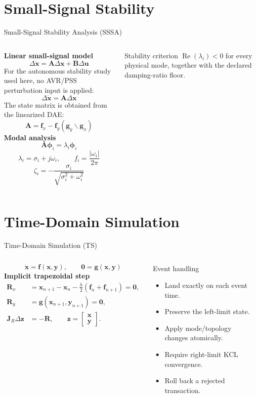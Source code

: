 \documentclass{beamer}
\begin{document}
\section{Small-Signal Stability}
\begin{frame}{Small-Signal Stability Analysis (SSSA)}
\begin{columns}[c,onlytextwidth]
\small
\textbf{Linear small-signal model}
\[
\Delta\dot{\bm x}=\bm A\Delta\bm x+\bm B\Delta\bm u
\]
For the autonomous stability study used here, no AVR/PSS perturbation input is applied:
\[
\boxed{\Delta\dot{\bm x}=\bm A\Delta\bm x}
\]
The state matrix is obtained from the linearized DAE:
\[
\boxed{\bm A=\bm f_x-\bm f_y\left(\bm g_y\backslash\bm g_x\right)}
\]
\small
\textbf{Modal analysis}
\[
\boxed{\bm A\bm\phi_i=\lambda_i\bm\phi_i}
\]
\[
\lambda_i=\sigma_i+j\omega_i,\qquad
f_i=\frac{|\omega_i|}{2\pi}
\]
\[
\zeta_i=-\frac{\sigma_i}{\sqrt{\sigma_i^2+\omega_i^2}}
\]
\begin{block}{Stability criterion}
$\operatorname{Re}(\lambda_i)<0$ for every physical mode, together with the declared damping-ratio floor.
\end{block}
\end{columns}
\end{frame}
\section{Time-Domain Simulation}
\begin{frame}{Time-Domain Simulation (TS)}
\begin{columns}[t,onlytextwidth]
\footnotesize
\[
\dot{\bm{x}}=\bm{f}(\bm{x},\bm{y}),\qquad
\bm{0}=\bm{g}(\bm{x},\bm{y})
\]
\textbf{Implicit trapezoidal step}
\begin{align*}
\bm{R}_x &= \bm{x}_{n+1}-\bm{x}_{n}
-\frac{h}{2}\left(\bm{f}_{n}+\bm{f}_{n+1}\right)=\bm{0},\\
\bm{R}_y &= \bm{g}(\bm{x}_{n+1},\bm{y}_{n+1})=\bm{0},\\
\bm{J}_R\Delta\bm{z} &= -\bm{R},\qquad
\bm{z}=\begin{bmatrix}\bm{x}\\\bm{y}\end{bmatrix}.
\end{align*}
\scriptsize
\begin{block}{Event handling}
\begin{itemize}
  \item Land exactly on each event time.
  \item Preserve the left-limit state.
  \item Apply mode/topology changes atomically.
  \item Require right-limit KCL convergence.
  \item Roll back a rejected transaction.
\end{itemize}
\end{block}
\end{columns}
\end{frame}
\end{document}
